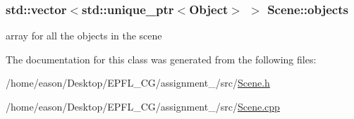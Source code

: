 \subsubsection[{\texorpdfstring{objects}{objects}}]{\setlength{\rightskip}{0pt plus 5cm}std\+::vector$<$std\+::unique\+\_\+ptr$<${\bf Object}$>$ $>$ Scene\+::objects\hspace{0.3cm}{\ttfamily [private]}}\hypertarget{classScene_abbd6f5b3a4639c3b089037519085bf86}{}\label{classScene_abbd6f5b3a4639c3b089037519085bf86}


array for all the objects in the scene 



The documentation for this class was generated from the following files\+:\begin{DoxyCompactItemize}
\item 
/home/eason/\+Desktop/\+E\+P\+F\+L\+\_\+\+C\+G/assignment\+\_/src/\hyperlink{Scene_8h}{Scene.\+h}\item 
/home/eason/\+Desktop/\+E\+P\+F\+L\+\_\+\+C\+G/assignment\+\_/src/\hyperlink{Scene_8cpp}{Scene.\+cpp}\end{DoxyCompactItemize}
